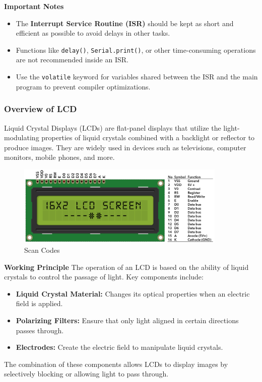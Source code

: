 \documentclass{article}
\numberwithin{equation}{section}
\numberwithin{figure}{section}
\numberwithin{table}{section}
\begin{document}
\textbf{Important Notes}
\begin{itemize}
    \item The \textbf{Interrupt Service Routine (ISR)} should be kept as short and efficient as possible to avoid delays in other tasks.
    \item Functions like \texttt{delay()}, \texttt{Serial.print()}, or other time-consuming operations are not recommended inside an ISR.
    \item Use the \texttt{volatile} keyword for variables shared between the ISR and the main program to prevent compiler optimizations.
\end{itemize}

\subsubsection{Overview of LCD}
Liquid Crystal Displays (LCDs) are flat-panel displays that utilize the light-modulating properties of liquid crystals combined with a backlight or reflector to produce images. They are widely used in devices such as televisions, computer monitors, mobile phones, and more.\cite{lcd}
\begin{figure}[htbp]
    \includegraphics[width=10cm, keepaspectratio]{16X2-LCD-PINS.PNG}
    \centering
    \caption{Scan Codes}
    \label{fig:fig5}
\end{figure}

\textbf{Working Principle}
The operation of an LCD is based on the ability of liquid crystals to control the passage of light. Key components include:
\begin{itemize}
    \item \textbf{Liquid Crystal Material:} Changes its optical properties when an electric field is applied.
    \item \textbf{Polarizing Filters:} Ensure that only light aligned in certain directions passes through.
    \item \textbf{Electrodes:} Create the electric field to manipulate liquid crystals.
\end{itemize}
The combination of these components allows LCDs to display images by selectively blocking or allowing light to pass through.
\end{document}
